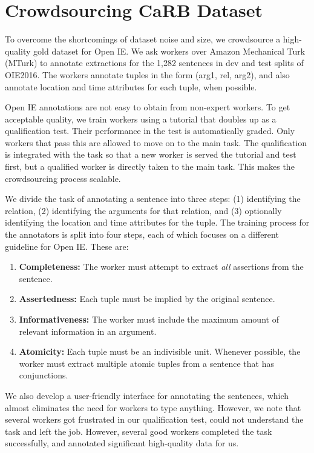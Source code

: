 \section{Crowdsourcing CaRB Dataset}

    To overcome the shortcomings of dataset noise and size, we crowdsource a high-quality gold dataset for Open IE. We ask  workers over Amazon Mechanical Turk (MTurk) to annotate extractions for the 1,282 sentences in dev and test splits of OIE2016. The workers annotate tuples in the form (arg1, rel, arg2), and also annotate location and time attributes for each tuple, when possible. 

    Open IE annotations are not easy to obtain from non-expert workers. To get acceptable quality,  we train workers using a tutorial that doubles up as a qualification test. Their performance in the test is automatically graded. Only workers that pass this are allowed to move on to the main task. The qualification is integrated with the task so that a new worker is served the tutorial and test first, but a qualified worker is directly taken to the main task. This makes the crowdsourcing process scalable. 

    We divide the task of annotating a sentence into three steps: (1) identifying the relation, (2) identifying the arguments for that relation, and (3) optionally identifying the location and time attributes for the tuple.  The training process for the annotators is split into four steps,  each of which focuses on a different guideline for Open IE. These are:

    \begin{enumerate}%
        \item {\bf Completeness:} The worker must attempt to extract {\em all} assertions from the sentence.
        \item {\bf Assertedness:} Each tuple must be implied by the original sentence.
        \item {\bf Informativeness:} The worker must include the maximum amount of relevant information in an argument.
        \item {\bf Atomicity:} Each tuple must be an indivisible unit. Whenever possible, the worker must extract multiple atomic tuples from a sentence that has conjunctions. 
    \end{enumerate}
    
    We also develop a user-friendly interface for annotating the sentences, which almost eliminates the need for workers to type anything. 
    However, we note that several workers got frustrated in our qualification test, could not understand the task and left the job. However, several good workers completed the task successfully, and annotated significant high-quality data for us.
    
